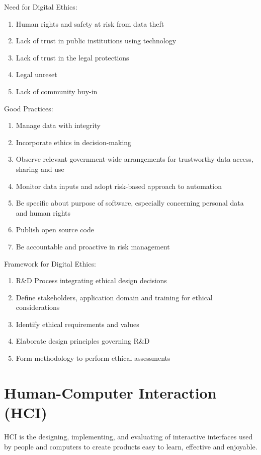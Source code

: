 \documentclass[12pt, a4paper]{article}
\begin{document}
\begin{multicols*}{3}
Need for Digital Ethics:
\begin{enumerate}[\roman*.]
  \item Human rights and safety at risk from data theft
  \item Lack of trust in public institutions using technology
  \item Lack of trust in the legal protections 
  \item Legal unreset
  \item Lack of community buy-in
\end{enumerate}

Good Practices:
\begin{enumerate}[\roman*.]
  \item Manage data with integrity
  \item Incorporate ethics in decision-making
  \item Observe relevant government-wide arrangements for trustworthy data access, sharing and use
  \item Monitor data inputs and adopt risk-based approach to automation 
  \item Be specific about purpose of software, especially concerning personal data and human rights
  \item Publish open source code
  \item Be accountable and proactive in risk management
\end{enumerate}

Framework for Digital Ethics:
\begin{enumerate}[\roman*.]
  \item R\&D Process integrating ethical design decisions
  \item Define stakeholders, application domain and training for ethical considerations
  \item Identify ethical requirements and values
  \item Elaborate design principles governing R\&D 
  \item Form methodology to perform ethical assessments
\end{enumerate}

\section{Human-Computer Interaction (HCI)}
HCI is the designing, implementing, and evaluating of interactive interfaces used by people and computers to create products easy to learn, effective and enjoyable.


\end{multicols*}
\end{document}
